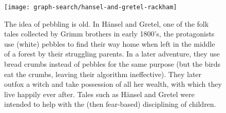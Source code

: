 \begin{notesonly}
\begin{figure}
\begin{center}
\texttt{[image: graph-search/hansel-and-gretel-rackham]}
\end{center}
\caption{The idea of pebbling is old.  In H\"ansel and Gretel, one of
  the folk tales collected by Grimm brothers in early 1800's, the
  protagonists use (white) pebbles to find their way home when left in
  the middle of a forest by their struggling parents.  In a later
  adventure, they use bread crumbs instead of pebbles for the same
  purpose (but the birds eat the crumbs, leaving their algorithm
  ineffective).  They later outfox a witch and take possession of all
  her wealth, with which they live happily ever after.  Tales such as
  H\"ansel and Gretel were intended to help with the (then fear-based)
  disciplining of children.  
}
\label{fig:dfs::hansel-and-gretel}
\end{figure}
\end{notesonly}




